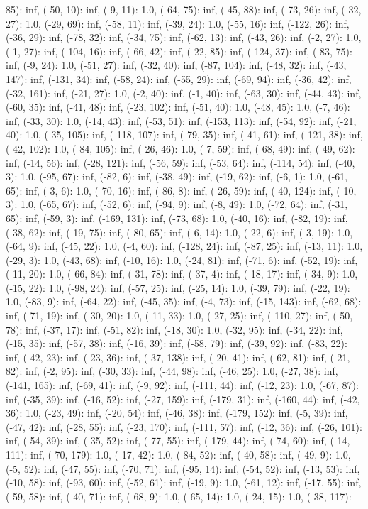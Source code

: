 \documentclass[parskip=half]{scrartcl}
\begin{document}
85): inf, (-50, 10): inf, (-9, 11): 1.0, (-64, 75): inf, (-45, 88): inf, (-73, 26): inf, (-32, 27): 1.0, (-29, 69): inf, (-58, 11): inf, (-39, 24): 1.0, (-55, 16): inf, (-122, 26): inf, (-36, 29): inf, (-78, 32): inf, (-34, 75): inf, (-62, 13): inf, (-43, 26): inf, (-2, 27): 1.0, (-1, 27): inf, (-104, 16): inf, (-66, 42): inf, (-22, 85): inf, (-124, 37): inf, (-83, 75): inf, (-9, 24): 1.0, (-51, 27): inf, (-32, 40): inf, (-87, 104): inf, (-48, 32): inf, (-43, 147): inf, (-131, 34): inf, (-58, 24): inf, (-55, 29): inf, (-69, 94): inf, (-36, 42): inf, (-32, 161): inf, (-21, 27): 1.0, (-2, 40): inf, (-1, 40): inf, (-63, 30): inf, (-44, 43): inf, (-60, 35): inf, (-41, 48): inf, (-23, 102): inf, (-51, 40): 1.0, (-48, 45): 1.0, (-7, 46): inf, (-33, 30): 1.0, (-14, 43): inf, (-53, 51): inf, (-153, 113): inf, (-54, 92): inf, (-21, 40): 1.0, (-35, 105): inf, (-118, 107): inf, (-79, 35): inf, (-41, 61): inf, (-121, 38): inf, (-42, 102): 1.0, (-84, 105): inf, (-26, 46): 1.0, (-7, 59): inf, (-68, 49): inf, (-49, 62): inf, (-14, 56): inf, (-28, 121): inf, (-56, 59): inf, (-53, 64): inf, (-114, 54): inf, (-40, 3): 1.0, (-95, 67): inf, (-82, 6): inf, (-38, 49): inf, (-19, 62): inf, (-6, 1): 1.0, (-61, 65): inf, (-3, 6): 1.0, (-70, 16): inf, (-86, 8): inf, (-26, 59): inf, (-40, 124): inf, (-10, 3): 1.0, (-65, 67): inf, (-52, 6): inf, (-94, 9): inf, (-8, 49): 1.0, (-72, 64): inf, (-31, 65): inf, (-59, 3): inf, (-169, 131): inf, (-73, 68): 1.0, (-40, 16): inf, (-82, 19): inf, (-38, 62): inf, (-19, 75): inf, (-80, 65): inf, (-6, 14): 1.0, (-22, 6): inf, (-3, 19): 1.0, (-64, 9): inf, (-45, 22): 1.0, (-4, 60): inf, (-128, 24): inf, (-87, 25): inf, (-13, 11): 1.0, (-29, 3): 1.0, (-43, 68): inf, (-10, 16): 1.0, (-24, 81): inf, (-71, 6): inf, (-52, 19): inf, (-11, 20): 1.0, (-66, 84): inf, (-31, 78): inf, (-37, 4): inf, (-18, 17): inf, (-34, 9): 1.0, (-15, 22): 1.0, (-98, 24): inf, (-57, 25): inf, (-25, 14): 1.0, (-39, 79): inf, (-22, 19): 1.0, (-83, 9): inf, (-64, 22): inf, (-45, 35): inf, (-4, 73): inf, (-15, 143): inf, (-62, 68): inf, (-71, 19): inf, (-30, 20): 1.0, (-11, 33): 1.0, (-27, 25): inf, (-110, 27): inf, (-50, 78): inf, (-37, 17): inf, (-51, 82): inf, (-18, 30): 1.0, (-32, 95): inf, (-34, 22): inf, (-15, 35): inf, (-57, 38): inf, (-16, 39): inf, (-58, 79): inf, (-39, 92): inf, (-83, 22): inf, (-42, 23): inf, (-23, 36): inf, (-37, 138): inf, (-20, 41): inf, (-62, 81): inf, (-21, 82): inf, (-2, 95): inf, (-30, 33): inf, (-44, 98): inf, (-46, 25): 1.0, (-27, 38): inf, (-141, 165): inf, (-69, 41): inf, (-9, 92): inf, (-111, 44): inf, (-12, 23): 1.0, (-67, 87): inf, (-35, 39): inf, (-16, 52): inf, (-27, 159): inf, (-179, 31): inf, (-160, 44): inf, (-42, 36): 1.0, (-23, 49): inf, (-20, 54): inf, (-46, 38): inf, (-179, 152): inf, (-5, 39): inf, (-47, 42): inf, (-28, 55): inf, (-23, 170): inf, (-111, 57): inf, (-12, 36): inf, (-26, 101): inf, (-54, 39): inf, (-35, 52): inf, (-77, 55): inf, (-179, 44): inf, (-74, 60): inf, (-14, 111): inf, (-70, 179): 1.0, (-17, 42): 1.0, (-84, 52): inf, (-40, 58): inf, (-49, 9): 1.0, (-5, 52): inf, (-47, 55): inf, (-70, 71): inf, (-95, 14): inf, (-54, 52): inf, (-13, 53): inf, (-10, 58): inf, (-93, 60): inf, (-52, 61): inf, (-19, 9): 1.0, (-61, 12): inf, (-17, 55): inf, (-59, 58): inf, (-40, 71): inf, (-68, 9): 1.0, (-65, 14): 1.0, (-24, 15): 1.0, (-38, 117): 
\end{document}
